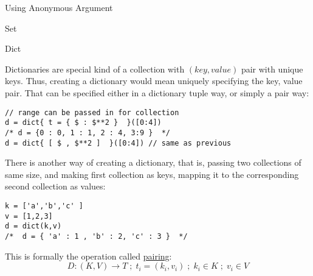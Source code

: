 \begin{section}{Using Anonymous Argument}
\begin{subsection}{Set}
\end{subsection}

\begin{subsection}{Dict}

Dictionaries are special kind of a collection with $(key,value)$ pair with unique keys.
Thus, creating a dictionary would mean uniquely specifying the key, value pair.
That can be specified either in a dictionary tuple way, or simply a pair way: 

\begin{lstlisting}[style=JexlStyle]
// range can be passed in for collection
d = dict{ t = { $ : $**2 }  }([0:4])
/* d = {0 : 0, 1 : 1, 2 : 4, 3:9 }  */
d = dict{ [ $ , $**2 ]  }([0:4]) // same as previous
\end{lstlisting}

There is another way of creating a dictionary, that is, 
passing two collections of same size, and making first collection 
as keys, mapping it to the corresponding second collection as values:

\begin{lstlisting}[style=JexlStyle]
k = ['a','b','c' ]
v = [1,2,3]
d = dict(k,v)
/*  d = { 'a' : 1 , 'b' : 2, 'c' : 3 }  */ 
\end{lstlisting}

This is formally the operation called \href{https://en.wikipedia.org/wiki/Pairing}{pairing}:
$$
D : (K,V) \to T \; ; \; t_i = ( k_i, v_i ) \; ; \; k_i \in K \; ; \; v_i \in V 
$$

\end{subsection}

\end{section}


